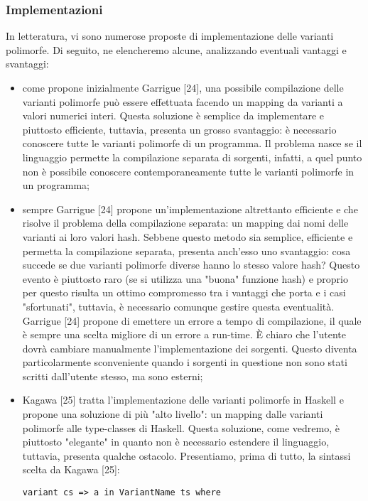 \documentclass[10pt,a4paper]{article}
\begin{document}
\subsubsection{Implementazioni}
In letteratura, vi sono numerose proposte di implementazione delle varianti polimorfe. Di seguito, ne elencheremo alcune,
analizzando eventuali vantaggi e svantaggi:
\begin{itemize}
    \item come propone inizialmente Garrigue [24], una possibile compilazione delle varianti polimorfe può essere effettuata
    facendo un mapping da varianti a valori numerici interi. Questa soluzione è semplice da implementare e piuttosto
    efficiente, tuttavia, presenta un grosso svantaggio: è necessario conoscere tutte le varianti polimorfe di un programma.
    Il problema nasce se il linguaggio permette la compilazione separata di sorgenti, infatti, a quel punto non è possibile
    conoscere contemporaneamente tutte le varianti polimorfe in un programma;
    \item sempre Garrigue [24] propone un'implementazione altrettanto efficiente e che risolve il problema della
    compilazione separata: un mapping dai nomi delle varianti ai loro valori hash. Sebbene questo metodo sia semplice,
    efficiente e permetta la compilazione separata, presenta anch'esso uno svantaggio: cosa succede se due varianti
    polimorfe diverse hanno lo stesso valore hash? Questo evento è piuttosto raro (se si utilizza una "buona" funzione hash)
    e proprio per questo risulta un ottimo compromesso tra i vantaggi che porta e i casi "sfortunati", tuttavia, è
    necessario comunque gestire questa eventualità. Garrigue [24] propone di emettere un errore a tempo di compilazione,
    il quale è sempre una scelta migliore di un errore a run-time. \`E chiaro che l'utente dovrà cambiare manualmente
    l'implementazione dei sorgenti. Questo diventa particolarmente sconveniente quando i sorgenti in questione non sono
    stati scritti dall'utente stesso, ma sono esterni;
    \item Kagawa [25] tratta l'implementazione delle varianti polimorfe in Haskell e propone una soluzione di più
    "alto livello": un mapping dalle varianti polimorfe alle type-classes di Haskell. Questa soluzione, come vedremo, è
    piuttosto "elegante" in quanto non è necessario estendere il linguaggio, tuttavia, presenta qualche ostacolo.
    Presentiamo, prima di tutto, la sintassi scelta da Kagawa [25]:
\begin{lstlisting}
variant cs => a in VariantName ts where

\end{lstlisting}
\end{itemize}
\end{document}

